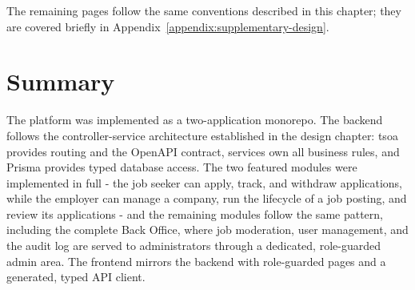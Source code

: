The remaining pages follow the same conventions described in this chapter; they are covered briefly in Appendix~\ref{appendix:supplementary-design}.



\section{Summary}

The platform was implemented as a two-application monorepo. The backend follows the controller-service architecture established in the design chapter: tsoa provides routing and the OpenAPI contract, services own all business rules, and Prisma provides typed database access. The two featured modules were implemented in full - the job seeker can apply, track, and withdraw applications, while the employer can manage a company, run the lifecycle of a job posting, and review its applications - and the remaining modules follow the same pattern, including the complete Back Office, where job moderation, user management, and the audit log are served to administrators through a dedicated, role-guarded admin area. The frontend mirrors the backend with role-guarded pages and a generated, typed API client.